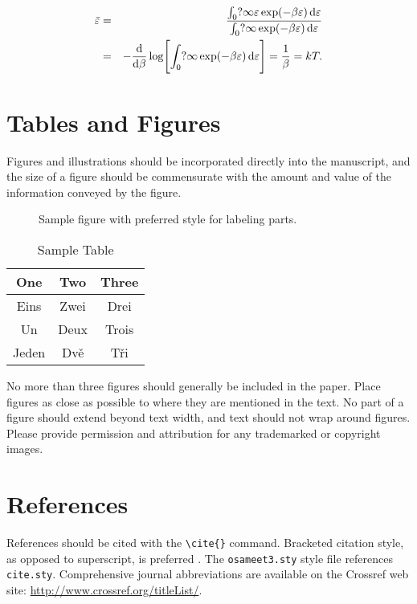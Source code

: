 \documentclass[letterpaper,10pt]{article}
\begin{document}
\begin{eqnarray}
\bar\varepsilon &=& \frac{\int_0?\infty\varepsilon
\exp(-\beta\varepsilon)\,{\rm d}\varepsilon}{\int_0?\infty
\exp(-\beta\varepsilon)\,{\rm d}\varepsilon}\nonumber\\
&=& -\frac{{\rm d}}{{\rm d}\beta}\log\Biggl[\int_0?\infty\exp
(-\beta\varepsilon)\,{\rm d}\varepsilon\Biggr]=\frac1\beta=kT.
\end{eqnarray}

\section{Tables and Figures}
Figures and illustrations should be incorporated directly into the
manuscript, and the size of a figure should be commensurate with the amount
and value of the information conveyed by the figure.

\begin{figure}[htbp]
  \centering
\caption{Sample figure with preferred style for labeling parts.}
\end{figure}


\begin{table}[htb]
 \centering \caption{Sample Table}
\begin{tabular}{ccc}
    \hline
    One & Two & Three \\
    \hline
    Eins & Zwei & Drei \\
    Un & Deux & Trois \\
    Jeden & Dv\v{e} & T\v{r}i \\
    \hline
   \end{tabular}
    \end{table}

No more than three figures should generally be included in the paper. Place figures as close as possible to where they
are mentioned in the text. No part of a figure should extend beyond text width, and text should not wrap around figures. Please provide permission and attribution for any trademarked or copyright images.

\section{References}
References should be cited with the \verb+\cite{}+ command.
Bracketed citation style, as opposed to superscript, is preferred
\cite{krishnan00,vantrigt97,masters93,shoop97,kalman76,craig96,steup96}.
The \texttt{osameet3.sty} style file references \texttt{cite.sty}. Comprehensive journal abbreviations are available on the Crossref web site:
\href{http://www.crossref.org/titleList/}{http://www.crossref.org/titleList/}.
\end{document}
